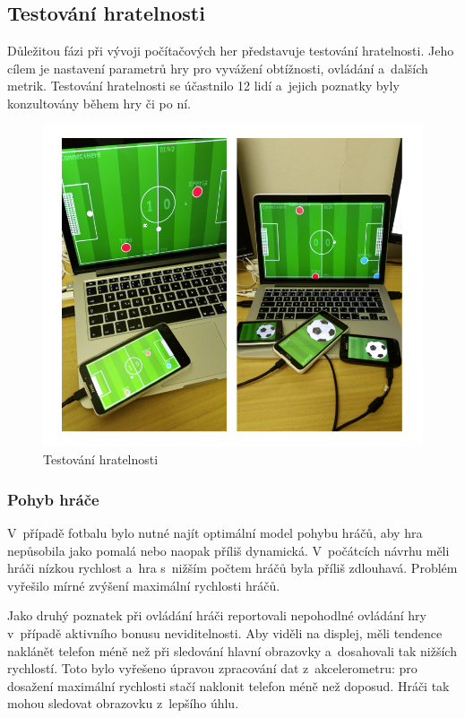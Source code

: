 \documentclass[thesis=B,czech,hidelinks]{FITthesis}[2012/06/26] %
\begin{document}
\subsection{Testování hratelnosti}

Důležitou fázi při vývoji počítačových her představuje testování hratelnosti. Jeho cílem je nastavení parametrů hry pro vyvážení obtížnosti, ovládání a~dalších metrik. Testování hratelnosti se účastnilo 12 lidí a~jejich poznatky byly konzultovány během hry či po ní.

\begin{figure}[h]
\center
\includegraphics[width=\textwidth]{testing}
\caption{Testování hratelnosti}
\label{picture:testing}
\end{figure}

\subsubsection{Pohyb hráče}

V~případě fotbalu bylo nutné najít optimální model pohybu hráčů, aby hra nepůsobila jako pomalá nebo naopak příliš dynamická. V~počátcích návrhu měli hráči nízkou rychlost a~hra s~nižším počtem hráčů byla příliš zdlouhavá. Problém vyřešilo mírné zvýšení maximální rychlosti hráčů.

Jako druhý poznatek při ovládání hráči reportovali nepohodlné ovládání hry v~případě aktivního bonusu neviditelnosti. Aby viděli na displej, měli tendence naklánět telefon méně než při sledování hlavní obrazovky a~dosahovali tak nižších rychlostí. Toto bylo vyřešeno úpravou zpracování dat z~akcelerometru: pro dosažení maximální rychlosti stačí naklonit telefon méně než doposud. Hráči tak mohou sledovat obrazovku z~lepšího úhlu.
\end{document}
